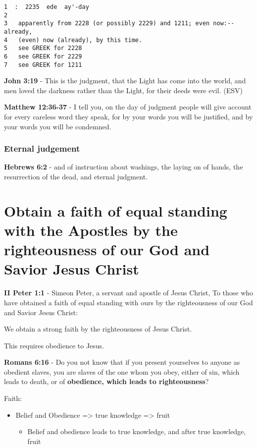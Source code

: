 \documentclass[11pt]{article}
\begin{document}
\begin{verbatim}
1  :  2235  ede  ay'-day
2  
3   apparently from 2228 (or possibly 2229) and 1211; even now:--already,
4   (even) now (already), by this time.
5   see GREEK for 2228
6   see GREEK for 2229
7   see GREEK for 1211
\end{verbatim}

\textbf{John 3:19} - This is the judgment, that the Light has come into the world, and men loved the darkness rather than the Light, for their deeds were evil. (ESV)


\textbf{Matthew 12:36-37} - I tell you, on the day of judgment people will give account for every careless word they speak, for by your words you will be justified, and by your words you will be condemned.

\subsubsection{Eternal judgement}
\label{sec:org4930eac}
\textbf{Hebrews 6:2} - and of instruction about washings, the laying on of hands, the resurrection of the dead, and eternal judgment.

\section{Obtain a faith of equal standing with the Apostles by the righteousness of our God and Savior Jesus Christ}
\label{sec:org3feb21e}
\textbf{II Peter 1:1} - Simeon Peter, a servant and apostle of Jesus Christ, To those who have obtained a faith of equal standing with ours by the righteousness of our God and Savior Jesus Christ:

We obtain a strong faith by the righteousness of Jesus Christ.

This requires obedience to Jesus.

\textbf{Romans 6:16} - Do you not know that if you present yourselves to anyone as obedient slaves, you are slaves of the one whom you obey, either of sin, which leads to death, or of \textbf{obedience, which leads to righteousness}?

Faith:
\begin{itemize}
\item Belief and Obedience => true knowledge => fruit
\begin{itemize}
\item Belief and obedience leads to true knowledge, and after true knowledge, fruit
\end{itemize}
\end{itemize}
\end{document}
